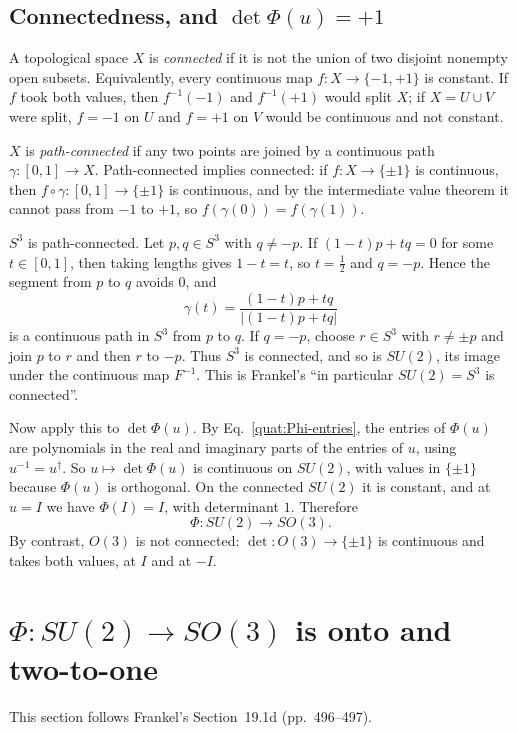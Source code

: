 \subsection{Connectedness, and \texorpdfstring{$\det\Phi(u)=+1$}{det Phi(u)=+1}}
A topological space $X$ is \emph{connected} if it is not the union of two
disjoint nonempty open subsets. Equivalently, every continuous map
$f\colon X\to\{-1,+1\}$ is constant. If $f$ took both values, then
$f^{-1}(-1)$ and $f^{-1}(+1)$ would split $X$; if $X=U\cup V$ were split,
$f=-1$ on $U$ and $f=+1$ on $V$ would be continuous and not constant.

$X$ is \emph{path-connected} if any two points are joined by a continuous
path $\gamma\colon[0,1]\to X$. Path-connected implies connected: if
$f\colon X\to\{\pm1\}$ is continuous, then $f\circ\gamma\colon[0,1]\to
\{\pm1\}$ is continuous, and by the intermediate value theorem it cannot
pass from $-1$ to $+1$, so $f(\gamma(0))=f(\gamma(1))$.

$S^3$ is path-connected. Let $p,q\in S^3$ with $q\ne-p$. If
$(1-t)p+tq=0$ for some $t\in[0,1]$, then taking lengths gives $1-t=t$, so
$t=\frac12$ and $q=-p$. Hence the segment from $p$ to $q$ avoids $0$, and
\begin{equation}
 \gamma(t)=\frac{(1-t)p+tq}{|(1-t)p+tq|}
\end{equation}
is a continuous path in $S^3$ from $p$ to $q$. If $q=-p$, choose
$r\in S^3$ with $r\ne\pm p$ and join $p$ to $r$ and then $r$ to $-p$. Thus
$S^3$ is connected, and so is $SU(2)$, its image under the continuous map
$F^{-1}$. This is Frankel's ``in particular $SU(2)=S^3$ is connected''.

Now apply this to $\det\Phi(u)$. By Eq.~\eqref{quat:Phi-entries}, the entries
of $\Phi(u)$ are polynomials in the real and imaginary parts of the entries
of $u$, using $u^{-1}=u^\dagger$. So $u\mapsto\det\Phi(u)$ is continuous on
$SU(2)$, with values in $\{\pm1\}$ because $\Phi(u)$ is orthogonal. On the
connected $SU(2)$ it is constant, and at $u=I$ we have $\Phi(I)=I$, with
determinant $1$. Therefore
\begin{equation}
 \Phi\colon SU(2)\to SO(3).
\end{equation}
By contrast, $O(3)$ is not connected: $\det\colon O(3)\to\{\pm1\}$ is
continuous and takes both values, at $I$ and at $-I$.

\section{\texorpdfstring{$\Phi\colon SU(2)\to SO(3)$}{Phi: SU(2) to SO(3)} is onto and two-to-one}\label{quat:sec:covering}
This section follows Frankel's Section~19.1d (pp.~496--497).

